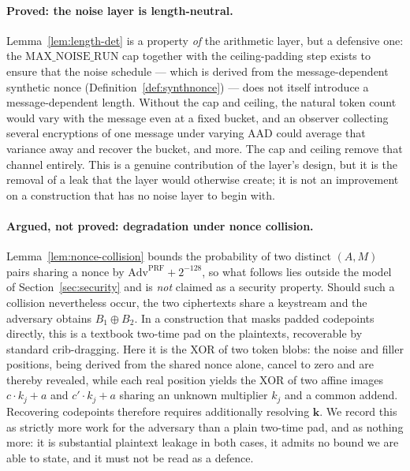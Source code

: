 \documentclass[11pt,a4paper]{article}
\begin{document}
\paragraph{Proved: the noise layer is length-neutral.}
Lemma~\ref{lem:length-det} is a property \emph{of} the arithmetic layer,
but a defensive one: the $\mathrm{MAX\_NOISE\_RUN}$ cap together with the
ceiling-padding step exists to ensure that the noise schedule — which is
derived from the message-dependent synthetic nonce
(Definition~\ref{def:synthnonce}) — does not itself introduce a
message-dependent length. Without the cap and ceiling, the natural token
count would vary with the message even at a fixed bucket, and an observer
collecting several encryptions of one message under varying AAD could
average that variance away and recover the bucket, and more. The cap and
ceiling remove that channel entirely. This is a genuine contribution of the
layer's design, but it is the removal of a leak that the layer would
otherwise create; it is not an improvement on a construction that has no
noise layer to begin with.

\paragraph{Argued, not proved: degradation under nonce collision.}
Lemma~\ref{lem:nonce-collision} bounds the probability of two distinct
$(A,M)$ pairs sharing a nonce by $\mathrm{Adv}^{\mathrm{PRF}}+2^{-128}$, so
what follows lies outside the model of Section~\ref{sec:security} and is
\emph{not} claimed as a security property. Should such a collision
nevertheless occur, the two ciphertexts share a keystream and the adversary
obtains $B_1\oplus B_2$. In a construction that masks padded codepoints
directly, this is a textbook two-time pad on the plaintexts, recoverable by
standard crib-dragging. Here it is the XOR of two token blobs: the noise
and filler positions, being derived from the shared nonce alone, cancel to
zero and are thereby revealed, while each real position yields the XOR of
two affine images $c\cdot k_j+a$ and $c'\cdot k_j+a$ sharing an unknown
multiplier $k_j$ and a common addend. Recovering codepoints therefore
requires additionally resolving $\mathbf{k}$. We record this as strictly
more work for the adversary than a plain two-time pad, and as nothing more:
it is substantial plaintext leakage in both cases, it admits no bound we
are able to state, and it must not be read as a defence.
\end{document}
